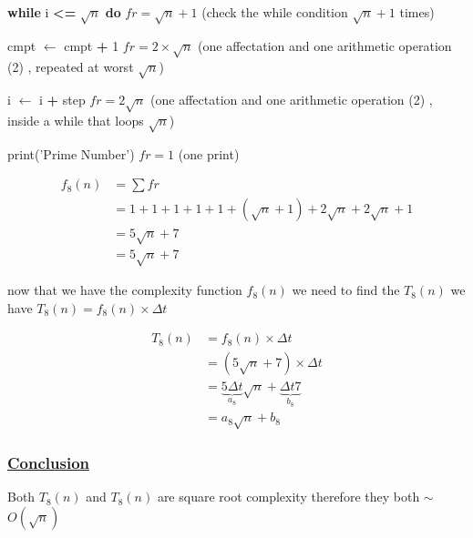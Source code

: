 \vspace{0.15cm}

\textbf{while} i \textcolor{redPlot}{\textbf{\textless=}} \(\sqrt{n}\)  \textbf{do} \hspace{2.45cm} \(fr = \sqrt{n}+1\) (check the while condition \(\sqrt{n}+1\) times)


\vspace{0.15cm}
cmpt $\gets$ cmpt \textcolor{redPlot}{ \textbf{+}} 1 \hspace{2.6cm} \(fr = 2\times\sqrt{n}\) (one affectation and one arithmetic operation (2) , repeated at worst \(\sqrt{n}\))

\vspace{0.15cm}

i $\gets$ i \textcolor{redPlot}{ \textbf{+}} step \hspace{3.5cm} \(fr = 2\sqrt{n}\) (one affectation and one arithmetic operation (2) , inside a while that loops \(\sqrt{n}\))

\vspace{0.15cm}

\textcolor{purplePlot!80!black}{print}(\textcolor{blueArea!60!black}{'Prime Number'}) \hspace{1.95cm} \(fr = 1\) (one print)

\vspace{0.75cm}

\begin{align*}
f_8(n) &= \sum fr \\
       &= 1 + 1 + 1 + 1 + 1 + (\sqrt{n}+1) + 2\sqrt{n} + 2\sqrt{n} + 1 \\
       &= 5\sqrt{n} + 7 \\
       &= \boxed{5\sqrt{n} + 7}
\end{align*}

\newpage 
now that we have the complexity function \(f_8(n)\) we need to find the \(T_8(n)\)  we have \(T_8(n) = f_8(n) \times \Delta t\)

\begin{align*}
T_8(n) &= f_8(n) \times \Delta t\\ 
       &= (5\sqrt{n} + 7) \times \Delta t \\
       &= \underbrace{5 \Delta t}_{a_8} \sqrt{n} + \underbrace{\Delta t 7}_{b_8} \\
&= \boxed{a_8\sqrt{n}+b_8} 
\end{align*}

\subsubsection*{\underline{Conclusion}}
Both \(T_8(n)\) and \(T_8(n)\) are square root complexity therefore they both $\sim$ \(O(\sqrt{n})\)



